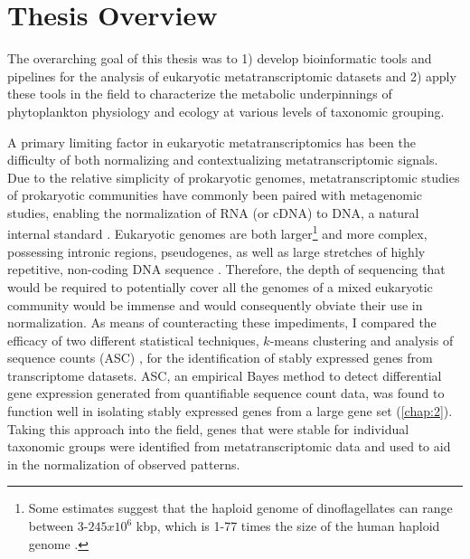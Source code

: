 \section{Thesis Overview}
The overarching goal of this thesis was to 1) develop bioinformatic tools and pipelines for the analysis of eukaryotic metatranscriptomic datasets and 2) apply these tools in the field to characterize the metabolic underpinnings of phytoplankton physiology and ecology at various levels of taxonomic grouping. \par

A primary limiting factor in eukaryotic metatranscriptomics has been the difficulty of both normalizing and contextualizing metatranscriptomic signals. Due to the relative simplicity of prokaryotic genomes, metatranscriptomic studies of prokaryotic communities have commonly been paired with metagenomic studies, enabling the normalization of RNA (or cDNA) to DNA, a natural internal standard \citep{Frias-Lopez2008, McCarren2010, Shi2011}. Eukaryotic genomes are both larger\footnote{Some estimates suggest that the haploid genome of dinoflagellates can range between 3-$245 x 10^6$ kbp, which is 1-77 times the size of  the human haploid genome \citep{Hou2009}.} and more complex, possessing intronic regions, pseudogenes, as well as large stretches of highly repetitive, non-coding DNA sequence \citep{Taft2007}. Therefore, the depth of sequencing that would be required to potentially cover all the genomes of a mixed eukaryotic community would be immense and would consequently obviate their use in normalization. As means of counteracting these impediments, I compared the efficacy of two different statistical techniques, $k$-means clustering \citep{Hartigan1979} and analysis of sequence counts (ASC) \citep{Wu2010}, for the identification of stably expressed genes from transcriptome datasets. ASC, an empirical Bayes method to detect differential gene expression generated from quantifiable sequence count data, was found to function well in isolating stably expressed genes from a large gene set (\cref{chap:2}). Taking this approach into the field, genes that were stable for individual taxonomic groups were identified from metatranscriptomic data and used to aid in the normalization of observed patterns. \par

